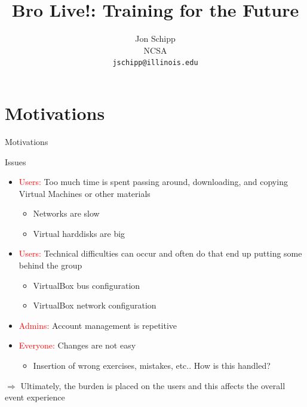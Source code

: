 \documentclass[xcolor=svgnames,handout]{beamer}
\title{Bro Live!: Training for the Future}
\author{Jon Schipp\\
\small NCSA\\
\texttt{jschipp@illinois.edu}}
\institute{%
BroCon14\\
NCSA, Champaign-Urbana, IL
}
\date[]{}
\begin{document}
\begin{frame}[plain]
  \titlepage
\end{frame}

\section{Motivations}

\begin{frame}[fragile]{Motivations}
  \begin{block}{Issues}
    \begin{itemize}
      \item \textcolor{red}{Users:} Too much time is spent passing around, downloading, and copying Virtual Machines or other materials
    	\begin{itemize}
		\item Networks are slow
		\item Virtual harddisks are big
    	\end{itemize}
      \item \textcolor{red}{Users:} Technical difficulties can occur and often do that end up putting some behind the group
    	\begin{itemize}
      		\item VirtualBox bus configuration
      		\item VirtualBox network configuration
    	\end{itemize}
      \item \textcolor{red}{Admins:} Account management is repetitive
      \item \textcolor{red}{Everyone:} Changes are not easy
    	\begin{itemize}
      		\item Insertion of wrong exercises, mistakes, etc.. How is this handled?
    	\end{itemize}
    \end{itemize}
  \end{block}
 \begin{center}
    \item[$\Rightarrow$]
      \alert{Ultimately, the burden is placed on the users and this affects the overall event experience}
  \end{center}
\end{frame}
\end{document}
